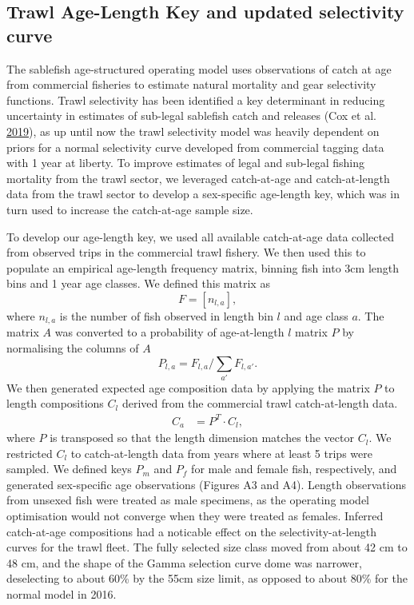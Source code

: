 \documentclass[11pt]{book}
\begin{document}
\hypertarget{trawl-age-length-key-and-updated-selectivity-curve}{%
\subsection{Trawl Age-Length Key and updated selectivity curve}\label{trawl-age-length-key-and-updated-selectivity-curve}}

The sablefish age-structured operating model uses observations of catch at age from commercial fisheries to estimate natural mortality and gear selectivity functions. Trawl selectivity has been identified a key determinant in reducing uncertainty in estimates of sub-legal sablefish catch and releases (Cox et al. \protect\hyperlink{ref-cox2019evaluating}{2019}), as up until now the trawl selectivity model was heavily dependent on priors for a normal selectivity curve developed from commercial tagging data with 1 year at liberty. To improve estimates of legal and sub-legal fishing mortality from the trawl sector, we leveraged catch-at-age and catch-at-length data from the trawl sector to develop a sex-specific age-length key, which was in turn used to increase the catch-at-age sample size.

To develop our age-length key, we used all available catch-at-age data collected from observed trips in the commercial trawl fishery. We then used this to populate an empirical age-length frequency matrix, binning fish into 3cm length bins and 1 year age classes. We defined this matrix as \begin{equation}
F = \left[ n_{l,a} \right],
\end{equation} where \(n_{l,a}\) is the number of fish observed in length bin \(l\) and age class \(a\). The matrix \(A\) was converted to a probability of age-at-length \(l\) matrix \(P\) by normalising the columns of \(A\) \begin{equation}
P_{l,a} = F_{l,a} / \sum_{a'} F_{l,a'}. 
\end{equation}
We then generated expected age composition data by applying the matrix \(P\) to length compositions \(C_l\) derived from the commercial trawl catch-at-length data. \begin{align}
C_a &= P^T \cdot C_l,
\end{align} where \(P\) is transposed so that the length dimension matches the vector \(C_l\). We restricted \(C_l\) to catch-at-length data from years where at least 5 trips were sampled. We defined keys \(P_m\) and \(P_f\) for male and female fish, respectively, and generated sex-specific age observations (Figures A3 and A4). Length observations from unsexed fish were treated as male specimens, as the operating model optimisation would not converge when they were treated as females.
Inferred catch-at-age compositions had a noticable effect on the selectivity-at-length curves for the trawl fleet. The fully selected size class moved from about 42 cm to 48 cm, and the shape of the Gamma selection curve dome was narrower, deselecting to about 60\% by the 55cm size limit, as opposed to about 80\% for the normal model in 2016.
\end{document}
